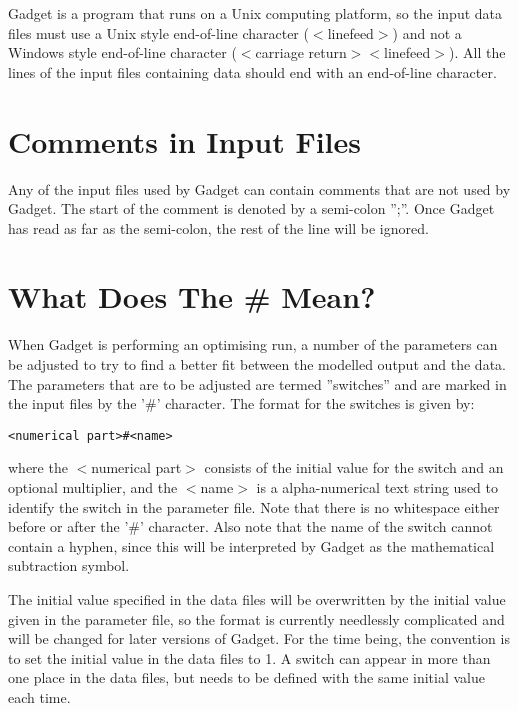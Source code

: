 \documentclass [a4paper, 10pt]{book}
\begin{document}
\bigskip
Gadget is a program that runs on a Unix computing platform, so the input data files must use a Unix style end-of-line character ($<$linefeed$>$) and not a Windows style end-of-line character ($<$carriage return$><$linefeed$>$).  All the lines of the input files containing data should end with an end-of-line character.

\section{Comments in Input Files}\label{sec:comments}
Any of the input files used by Gadget can contain comments that are not used by Gadget.  The start of the comment is denoted by a semi-colon '';''.  Once Gadget has read as far as the semi-colon, the rest of the line will be ignored.

\newpage %
\section{What Does The \# Mean?}\label{sec:whatdoeshash}
When Gadget is performing an optimising run, a number of the parameters can be adjusted to try to find a better fit between the modelled output and the data.  The parameters that are to be adjusted are termed ''switches'' and are marked in the input files by the '\#' character.  The format for the switches is given by:

{\small\begin{verbatim}
<numerical part>#<name>
\end{verbatim}}

where the $<$numerical part$>$ consists of the initial value for the switch and an optional multiplier, and the $<$name$>$ is a alpha-numerical text string used to identify the switch in the parameter file.  Note that there is no whitespace either before or after the '\#' character.  Also note that the name of the switch cannot contain a hyphen, since this will be interpreted by Gadget as the mathematical subtraction symbol.

\bigskip
The initial value specified in the data files will be overwritten by the initial value given in the parameter file, so the format is currently needlessly complicated and will be changed for later versions of Gadget.  For the time being, the convention is to set the initial value in the data files to 1.  A switch can appear in more than one place in the data files, but needs to be defined with the same initial value each time.
\end{document}
